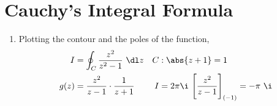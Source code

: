 \section{Cauchy's Integral Formula}

\begin{enumerate}
    \item Plotting the contour and the poles of the function,
          \begin{align}
              I    & = \oint_{C} \frac{z^2}{z^2 - 1}\ \dl z                   &
              C    & : \abs{z+1} = 1                                            \\
              g(z) & = \frac{z^2}{z-1} \cdot \frac{1}{z+1}                    &
              I    & = 2\pi \i\ \Bigg[\frac{z^2}{z-1}\Bigg]_{(-1)} = -\pi\ \i
          \end{align}


\end{enumerate}
